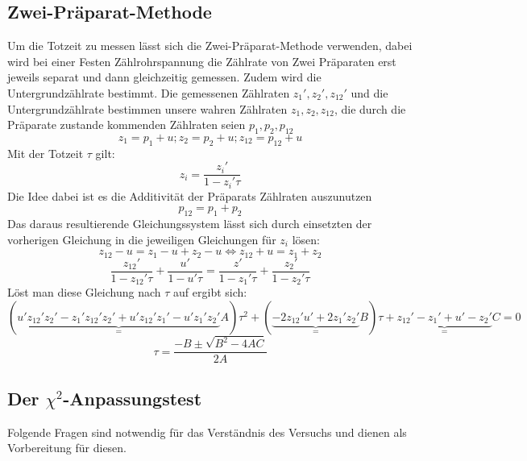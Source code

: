 \documentclass{article}
\begin{document}
            \subsection{Zwei-Präparat-Methode}
                Um die Totzeit zu messen lässt sich die Zwei-Präparat-Methode verwenden, dabei wird bei einer Festen Zählrohrspannung
                die Zählrate von Zwei Präparaten erst jeweils separat und dann gleichzeitig gemessen. Zudem wird die Untergrundzählrate
                bestimmt. Die gemessenen Zählraten $z_1',z_2',z_{12}'$ und die Untergrundzählrate bestimmen unsere wahren Zählraten $z_1,z_2,z_{12}$,
                die durch die Präparate zustande kommenden Zählraten seien $p_1,p_2,p_{12}$
                $$ z_1 = p_1 + u  ;  z_2 = p_2 + u  ;  z_{12} = p_{12} + u $$
                Mit der Totzeit $\tau$ gilt:
                $$ z_i = \frac{z_i'}{1-z_i'\tau}$$
                Die Idee dabei ist es die Additivität der Präparats Zählraten auszunutzen
                $$ p_{12} = p_1 + p_2$$
                Das daraus resultierende Gleichungssystem lässt sich durch einsetzten der vorherigen Gleichung in die jeweiligen Gleichungen für $z_i$
                lösen:
                $$z_{12} - u = z_1 - u + z_2 - u \Leftrightarrow z_{12} + u = z_1 + z_2$$
                $$\frac{z_{12}'}{1-z_{12}'\tau} + \frac{u'}{1-u'\tau} = \frac{z'}{1-z_1'\tau} + \frac{z_2'}{1-z_2'\tau}$$
                Löst man diese Gleichung nach $\tau$ auf ergibt sich:
                $$(\underbrace{u'z_{12}'z_2'-z_1'z_12'z_2'+u'z_12'z_1'-u'z_1'z_2'}_=A)\tau^2 + (\underbrace{-2z_{12}'u'+2z_1'z_2'}_=B)\tau + \underbrace{z_{12}'-z_1'+u'-z_2'}_=C = 0$$
                $$ \tau = \frac{-B \pm \sqrt{B^2 - 4AC}}{2A}$$
            \subsection{Der $\chi^2$-Anpassungstest}
                
    
    Folgende Fragen sind notwendig für das Verständnis des Versuchs und dienen als Vorbereitung für diesen.
\end{document}
